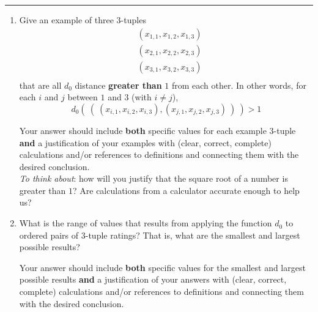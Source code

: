 \documentclass[12pt, oneside]{article}
\begin{document}
\begin{enumerate}
\rule{0.5\textwidth}{.4pt}

\begin{enumerate}
    \item Give an example of three $3$-tuples 
    \begin{align*}
    &(x_{1,1}, x_{1,2}, x_{1,3}) \\
    &(x_{2,1}, x_{2,2}, x_{2,3}) \\
    &(x_{3,1}, x_{3,2}, x_{3,3}) \\
    \end{align*}
    that are all $d_0$ distance {\bf greater than} $1$ from each other.  
    In other words, for each $i$ and $j$ between $1$ and 
    $3$ (with $i \neq j$), 
    \[
    d_{0}(~(~(x_{i,1}, x_{i,2}, x_{i,3})  , (x_{j,1}, x_{j,2}, x_{j,3})~)~) > 1
    \]
    
    Your answer should include  {\bf both} specific values for each example $3$-tuple {\bf and} a justification 
    of your examples with (clear, correct, complete) calculations and/or references to definitions and connecting them with
    the desired conclusion.\\
    
    {\it To think about}: 
    how will you justify that the square root of a number is greater than $1$?
    Are calculations from a calculator accurate enough to help us?

    \item What is the range of values that results from applying the function $d_0$
    to ordered pairs of $3$-tuple ratings? That is, what are the smallest and largest
    possible results?

    Your answer should include  {\bf both} specific values for the smallest and largest 
    possible results {\bf and} a justification 
    of your answers with (clear, correct, complete) calculations and/or references to definitions and connecting them with
    the desired conclusion.
\end{enumerate}
\end{enumerate}
\end{document}
